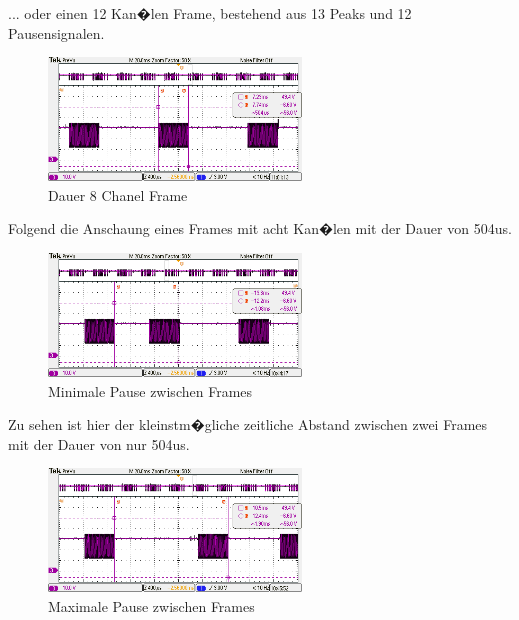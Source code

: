 ... oder einen 12 Kan�len Frame, bestehend aus 13 Peaks und 12 Pausensignalen.

\begin{figure}[H]
\centering
\includegraphics[width=0.6\textwidth]{fig_motor/Controller_Treiber/GraupnerGR16_8_ChX_Gap.png}
\caption[Dauer 8 chanel Frame ]{Dauer 8 Chanel Frame}
\end{figure}

Folgend die Anschaung eines Frames mit acht Kan�len mit der Dauer von 504us.

\begin{figure}[H]
	\centering
	\includegraphics[width=0.6\textwidth]{fig_motor/Controller_Treiber/GraupnerGR16_8_Ch1_Min.png}
	\caption[Minimale Pause zwischen Frames]{Minimale Pause zwischen Frames}
\end{figure}

Zu sehen ist hier der kleinstm�gliche zeitliche Abstand zwischen zwei Frames mit der Dauer von nur 504us.

\begin{figure}[H]
	\centering
	\includegraphics[width=0.6\textwidth]{fig_motor/Controller_Treiber/GraupnerGR16_8_Ch1_Max.png}
	\caption[Maximale Pause zwischen Frames]{Maximale Pause zwischen Frames}
\end{figure}

